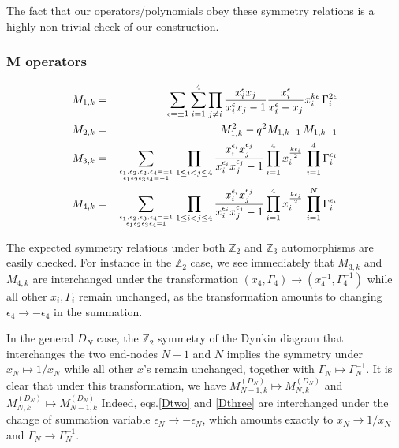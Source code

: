 \documentclass[12pt]{amsart}
\newcommand{\Z}{{\mathbb Z}}
\numberwithin{equation}{section}
\numberwithin{table}{section}
\begin{document}
\begin{appendix}
The fact that our operators/polynomials obey these symmetry relations is a highly non-trivial check of our
construction.


\subsubsection{M operators}

\begin{eqnarray*}
M_{1,k}&=&\sum_{\epsilon=\pm 1}\sum_{i=1}^4 \prod_{j\neq i} \frac{x_i^\epsilon x_j}{x_i^\epsilon x_j-1}
\frac{x_i^\epsilon}{x_i^\epsilon-x_j} x_i^{k\epsilon}\, \Gamma_i^{2\epsilon} \\
M_{2,k}&=&M_{1,k}^2-q^2 M_{1,k+1}\,M_{1,k-1}\\
{M}_{3,k}&=&
\sum_{\epsilon_1,\epsilon_2,\epsilon_3,\epsilon_4=\pm 1\atop \epsilon_1\epsilon_2\epsilon_3 \epsilon_4=-1}  
\prod_{1\leq i<j\leq 4} \frac{x_i^{\epsilon_i} x_j^{\epsilon_j}}{x_i^{\epsilon_i}x_j^{\epsilon_j}-1} 
\prod_{i=1}^4 x_i^{\frac{k\epsilon_i}{2}}\, \prod_{i=1}^4 \Gamma_i^{\epsilon_i}\\
{M}_{4,k}&=&
\sum_{\epsilon_1,\epsilon_2,\epsilon_3,\epsilon_4=\pm 1\atop \epsilon_1\epsilon_2\epsilon_3 \epsilon_4=1}  
\prod_{1\leq i<j\leq 4} \frac{x_i^{\epsilon_i} x_j^{\epsilon_j}}{x_i^{\epsilon_i}x_j^{\epsilon_j}-1} 
\prod_{i=1}^4 x_i^{\frac{k\epsilon_i}{2}}\, \prod_{i=1}^N \Gamma_i^{\epsilon_i}\\
\end{eqnarray*}

The expected symmetry relations under both $\Z_2$ and $\Z_3$ automorphisms are easily checked.
For instance in the $\Z_2$ case, we see immediately that $M_{3,k}$ and $M_{4,k}$ are interchanged 
under the transformation
$(x_4,\Gamma_4)\to (x_4^{-1},\Gamma_4^{-1})$ while all other $x_i, \Gamma_i$ remain unchanged,
as the transformation amounts to changing $\epsilon_4\to -\epsilon_4$ in the summation.

In the general $D_N$ case, the $\Z_2$ symmetry of the Dynkin diagram that interchanges the two end-nodes $N-1$ and $N$ implies the symmetry under $x_N\mapsto 1/x_N$ while all other $x$'s remain unchanged, together with $\Gamma_N\mapsto \Gamma_N^{-1}$. It is clear that under this transformation, we have
$M_{N-1,k}^{(D_N)}\mapsto M_{N,k}^{(D_N)}$ and $M_{N,k}^{(D_N)}\mapsto M_{N-1,k}^{(D_N)}$
Indeed, eqs.\eqref{Dtwo} and \eqref{Dthree} are interchanged under the change of summation variable
$\epsilon_N\to -\epsilon_N$, which amounts exactly to $x_N\to1/x_N$ and $\Gamma_N\to \Gamma_N^{-1}$.



\end{appendix}
\end{document}
